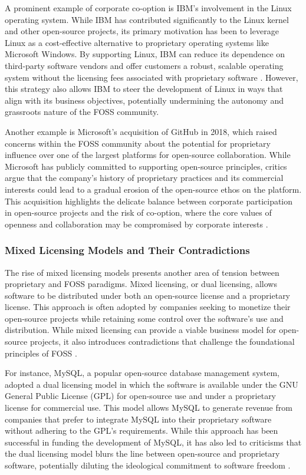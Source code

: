 \begin{refsection}
A prominent example of corporate co-option is IBM's involvement in the Linux operating system. While IBM has contributed significantly to the Linux kernel and other open-source projects, its primary motivation has been to leverage Linux as a cost-effective alternative to proprietary operating systems like Microsoft Windows. By supporting Linux, IBM can reduce its dependence on third-party software vendors and offer customers a robust, scalable operating system without the licensing fees associated with proprietary software \cite[pp.~102-108]{moody2002}. However, this strategy also allows IBM to steer the development of Linux in ways that align with its business objectives, potentially undermining the autonomy and grassroots nature of the FOSS community.

Another example is Microsoft's acquisition of GitHub in 2018, which raised concerns within the FOSS community about the potential for proprietary influence over one of the largest platforms for open-source collaboration. While Microsoft has publicly committed to supporting open-source principles, critics argue that the company's history of proprietary practices and its commercial interests could lead to a gradual erosion of the open-source ethos on the platform. This acquisition highlights the delicate balance between corporate participation in open-source projects and the risk of co-option, where the core values of openness and collaboration may be compromised by corporate interests \cite[pp.~200-205]{raymond2022}.

\subsubsection{Mixed Licensing Models and Their Contradictions}

The rise of mixed licensing models presents another area of tension between proprietary and FOSS paradigms. Mixed licensing, or dual licensing, allows software to be distributed under both an open-source license and a proprietary license. This approach is often adopted by companies seeking to monetize their open-source projects while retaining some control over the software's use and distribution. While mixed licensing can provide a viable business model for open-source projects, it also introduces contradictions that challenge the foundational principles of FOSS \cite[pp.~51-55]{vonhippel2006}.

For instance, MySQL, a popular open-source database management system, adopted a dual licensing model in which the software is available under the GNU General Public License (GPL) for open-source use and under a proprietary license for commercial use. This model allows MySQL to generate revenue from companies that prefer to integrate MySQL into their proprietary software without adhering to the GPL’s requirements. While this approach has been successful in funding the development of MySQL, it has also led to criticisms that the dual licensing model blurs the line between open-source and proprietary software, potentially diluting the ideological commitment to software freedom \cite[pp.~70-75]{moody2002}.


\end{refsection}
